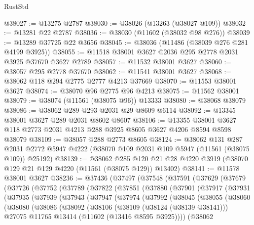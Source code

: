 \begin{lexlean}{RustStd}
\begin{coremodule}
@38027 := @13275 @2787
@38030 := @38026 (@13263 (@38027 @109))
@38032 := @13281 @22 @2787
@38036 := @38030 (@11602 (@38032 @98 @276))
@38039 := @13289 @37725 @22 @3656
@38045 := @38036 (@11486 (@38039 @276 @281 @4199 @3925))
@38055 := @11518 @38001 @3627 @2036 @295 @2778 @2031 @3925 @37670 @3627 @2789
@38057 := @11532 @38001 @3627
@38060 := @38057 @295 @2778 @37670
@38062 := @11541 @38001 @3627
@38068 := @38062 @118 @294 @2775 @2777 @4213 @37669
@38070 := @11553 @38001 @3627
@38074 := @38070 @96 @2775 @96 @4213
@38075 := @11562 @38001
@38079 := @38074 (@11561 (@38075 @96)) @13333
@38080 := @38068 @38079
@38086 := @38062 @289 @293 @2031 @29 @8609 @6114
@38092 := @13345 @38001 @3627 @289 @2031 @8602 @8607
@38106 := @13355 @38001 @3627 @118 @2773 @2031 @4213 @288 @3925 @8605 @3627 @4206 @8594 @8598 @38079
@38109 := @38057 @288 @2773 @8605
@38124 := @38062
    @131
    @287
    @2031
    @2772
    @5947
    @4222
    (@38070 @109 @2031 @109 @5947 (@11561 (@38075 @109)) @25192)
@38139 := @38062
    @285
    @120
    @21
    @28
    @4220
    @3919
    (@38070 @129 @21 @129 @4220 (@11561 (@38075 @129)) @13402)
@38141 := @11578 @38001 @3627
@38236 := @37436
    (@37497
      (@37548
        (@37591
          (@37629
            (@37679
              (@37726
                (@37752
                  (@37789
                    (@37822
                      (@37851
                        (@37880
                          (@37901
                            (@37917
                              (@37931
                                (@37935
                                  (@37939
                                    (@37943
                                      (@37947
                                        (@37974
                                          (@37992
                                            (@38045
                                              (@38055
                                                (@38060
                                                  (@38080
                                                    (@38086
                                                      (@38092
                                                        (@38106
                                                          (@38109 (@38124 (@38139 @38141)))
                                                          @27075
                                                          @11765
                                                          @13414
                                                          (@11602 (@13416 @8595 @3925))))
                                                      (@38062

\end{coremodule}
\end{lexlean}
